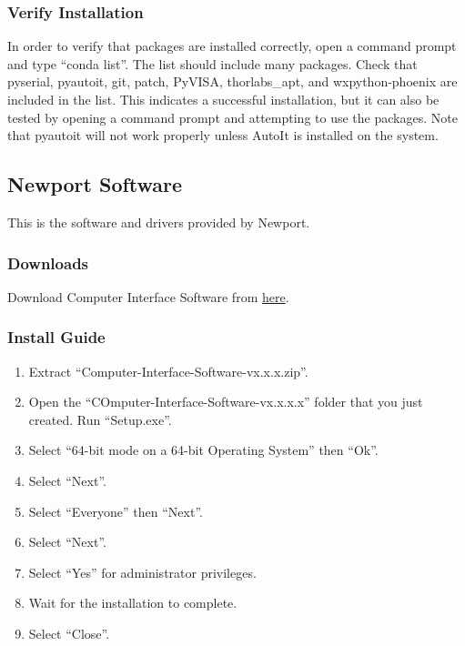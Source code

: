 \documentclass[11pt, letterpaper, titlepage]{article}
\begin{document}
\subsubsection{Verify Installation} %
In order to verify that packages are installed correctly, open a command prompt and type ``conda list''.
The list should include many packages.
Check that pyserial, pyautoit, git, patch, PyVISA, thorlabs\_apt, and wxpython-phoenix are included in the list.
This indicates a successful installation, but it can also be tested by opening a command prompt and attempting to use the packages.
Note that pyautoit will not work properly unless AutoIt is installed on the system.
\subsection{Newport Software} \label{newportsoftware} %
This is the software and drivers provided by Newport.
\subsubsection{Downloads} %
Download Computer Interface Software from \href{https://www.newport.com/f/1918-r-handheld-optical-power-&-energy-meter#resources}{here}.
\subsubsection{Install Guide} %
\begin{enumerate}
    \item Extract ``Computer-Interface-Software-vx.x.x.zip''.
    \item Open the ``COmputer-Interface-Software-vx.x.x.x'' folder that you just created.
          Run ``Setup.exe''.
    \item Select ``64-bit mode on a 64-bit Operating System'' then ``Ok''.
    \item Select ``Next''.
    \item Select ``Everyone'' then ``Next''.
    \item Select ``Next''.
    \item Select ``Yes'' for administrator privileges.
    \item Wait for the installation to complete.
    \item Select ``Close''.
\end{enumerate}
\end{document}
